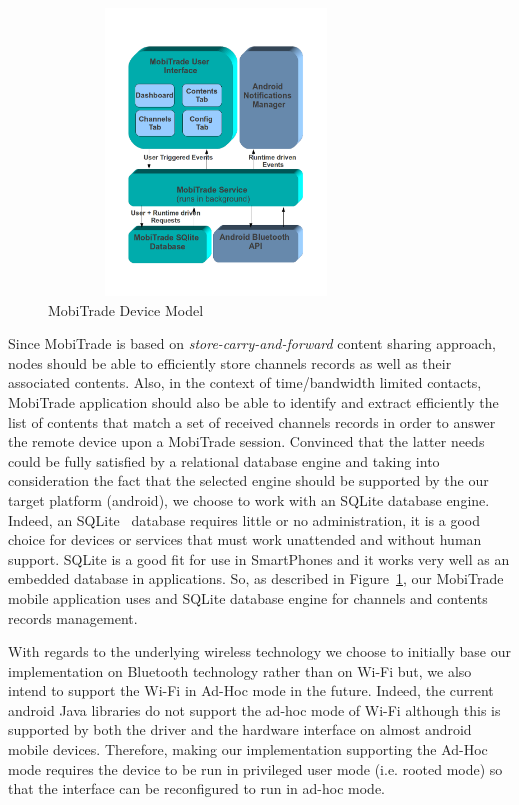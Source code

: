 \begin{figure}[!h]
\centering
\includegraphics[width=3.5in,height=3in]{Chapitre6/MobiTradeCommunicationArchitecture.png}
\vspace{-0.1in}
\caption{MobiTrade Device Model}
\label{MobiTrade-application}
\vspace{-0.1in}
\end{figure}

Since MobiTrade is based on \emph{store-carry-and-forward} content sharing approach, nodes should be able to efficiently store channels records as well as their associated contents. Also, in the context of time/bandwidth limited contacts, MobiTrade application should also be able to identify and extract efficiently the list of contents that match a set of received channels records in order to answer the remote device upon a MobiTrade session. Convinced that the latter needs could be fully satisfied by a relational database engine and taking into consideration the fact that the selected engine should be supported by the our target platform (android), we choose to work with an SQLite database engine. Indeed, an SQLite~\cite{SQLite} database requires little or no administration, it is a good choice for devices or services that must work unattended and without human support. SQLite is a good fit for use in SmartPhones and it works very well as an embedded database in applications. So, as described in Figure~\ref{MobiTrade-application}, our MobiTrade mobile application uses and SQLite database engine for channels and contents records management.

With regards to the underlying wireless technology we choose to initially base our implementation on Bluetooth technology rather than on Wi-Fi but, we also intend to support the Wi-Fi in Ad-Hoc mode in the future. Indeed, the current android Java libraries do not support the ad-hoc mode of Wi-Fi although this is supported by both the driver and the hardware interface on almost android mobile devices. Therefore, making our implementation supporting the Ad-Hoc mode requires the device to be run in privileged user mode (i.e. rooted mode) so that the interface can be reconfigured to run in ad-hoc mode.

